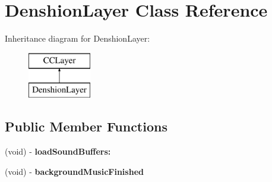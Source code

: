 \hypertarget{interface_denshion_layer}{\section{Denshion\-Layer Class Reference}
\label{interface_denshion_layer}
}
Inheritance diagram for Denshion\-Layer\-:\begin{figure}[H]
\begin{center}
\leavevmode
\includegraphics[height=2.000000cm]{interface_denshion_layer}
\end{center}
\end{figure}
\subsection*{Public Member Functions}
\begin{DoxyCompactItemize}
\item 
\hypertarget{interface_denshion_layer_adaea4f3f5f68ac31a78d3121983d5e49}{(void) -\/ {\bfseries load\-Sound\-Buffers\-:}}\label{interface_denshion_layer_adaea4f3f5f68ac31a78d3121983d5e49}

\item 
\hypertarget{interface_denshion_layer_a3c8ed893b3309de18df8d5dd8af289c7}{(void) -\/ {\bfseries background\-Music\-Finished}}\label{interface_denshion_layer_a3c8ed893b3309de18df8d5dd8af289c7}

\end{DoxyCompactItemize}
